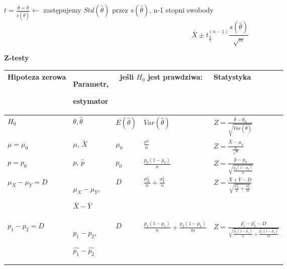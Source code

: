 \documentclass[a4paper]{article}
\begin{document}
    $t = \frac{\hat{\theta} = \theta}{s(\hat{\theta})} \leftarrow$ zastępujemy $Std(\hat{\theta})$ przez $s(\hat{\theta})$,
    n-1 stopni swobody
    \begin{equation*}
        \bar{X} \pm t_{\frac{\alpha}{2}}^{(n-1)} \frac{s(\hat{\theta})}{\sqrt{n}}
    \end{equation*}

    \textbf{Z-testy}

    \begin{table}[H]
        \begin{center}
            \begin{tabular}{ p{2.5cm} |p{2.5cm} |p{1.5cm} |p{4cm} |p{4cm}}
                \toprule
                Hipoteza zerowa & Parametr,

                estymator & \multicolumn{2}{c|}{jeśli $H_0$ jest prawdziwa:} & Statystyka \\
                \toprule

                $H_0$ & $\theta, \hat{\theta}$ & $E(\hat{\theta})$ & $Var(\hat{\theta})$ & $Z = \frac{\hat{\theta} - \theta_0}{\sqrt{Var(\hat{\theta})}}$\\

                \cmidrule(r){1-5}

                $\mu = \mu_0$ & $\mu$, $\bar{X}$ & $\mu_0$ & $\frac{\sigma^2}{n}$ & $Z = \frac{\bar{X} - \mu_0}{\frac{\sigma}{\sqrt{n}}}$\\

                \cmidrule(r){1-5}

                $p = p_0$ & $p$, $\hat{p}$ & $p_0$ & $\frac{p_0(1-p_0)}{n}$ & $Z = \frac{\hat{p} - p_0}{\sqrt{\frac{p_0(1-p_0)}{n}}}$\\

                \cmidrule(r){1-5}

                $\mu_X - \mu_Y = D$ &
                $\mu_X - \mu_Y$,

                $\bar{X} - \bar{Y}$
                & $D$ & $\frac{\sigma_X^2}{n} + \frac{\sigma_Y^2}{n}$ & $Z = \frac{\bar{X} + \bar{Y} - D}{\sqrt{\frac{\sigma_X^2}{n} + \frac{\sigma_Y^2}{m}}}$\\

                \cmidrule(r){1-5}

                $p_1 - p_2 = D$ & $p_1 - p_2$,

                $\hat{p_1} - \hat{p_2}$
                & $D$ & $\frac{p_1(1-p_1)}{n} + \frac{p_2(1-p_2)}{m}$ &
                $Z = \frac{\hat{p_1} - \hat{p_2} - D}{\sqrt{\frac{\hat{p_1}(1-\hat{p_1})}{n} + \frac{\hat{p_2}(1-\hat{p_2})}{m}}}$\\


\end{tabular}
\end{center}
\end{table}
\end{document}
